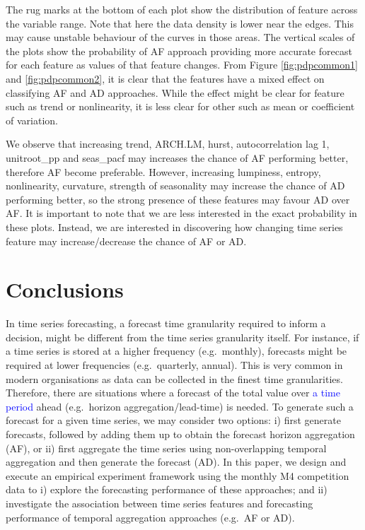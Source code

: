 \documentclass[preprint, 3p,
authoryear]{elsarticle} %
\begin{document}
The rug marks at the bottom of each plot show the distribution of
feature across the variable range. Note that here the data density is
lower near the edges. This may cause unstable behaviour of the curves in
those areas. The vertical scales of the plots show the probability of AF
approach providing more accurate forecast for each feature as values of
that feature changes. From Figure \ref{fig:pdpcommon1} and
\ref{fig:pdpcommon2}, it is clear that the features have a mixed effect
on classifying AF and AD approaches. While the effect might be clear for
feature such as trend or nonlinearity, it is less clear for other such
as mean or coefficient of variation.

We observe that increasing trend, ARCH.LM, hurst, autocorrelation lag 1,
unitroot\_pp and seas\_pacf may increases the chance of AF performing
better, therefore AF become preferable. However, increasing lumpiness,
entropy, nonlinearity, curvature, strength of seasonality may increase
the chance of AD performing better, so the strong presence of these
features may favour AD over AF. It is important to note that we are less
interested in the exact probability in these plots. Instead, we are
interested in discovering how changing time series feature may
increase/decrease the chance of AF or AD.

\hypertarget{con}{%
\section{Conclusions}\label{con}}

In time series forecasting, a forecast time granularity required to
inform a decision, might be different from the time series granularity
itself. For instance, if a time series is stored at a higher frequency
(e.g.~monthly), forecasts might be required at lower frequencies
(e.g.~quarterly, annual). This is very common in modern organisations as
data can be collected in the finest time granularities. Therefore, there
are situations where a forecast of the total value over
\textcolor{blue}{a time period} ahead (e.g.~horizon
aggregation/lead-time) is needed. To generate such a forecast for a
given time series, we may consider two options: i) first generate
forecasts, followed by adding them up to obtain the forecast horizon
aggregation (AF), or ii) first aggregate the time series using
non-overlapping temporal aggregation and then generate the forecast
(AD). In this paper, we design and execute an empirical experiment
framework using the monthly M4 competition data to i) explore the
forecasting performance of these approaches; and ii) investigate the
association between time series features and forecasting performance of
temporal aggregation approaches (e.g.~AF or AD).
\end{document}
